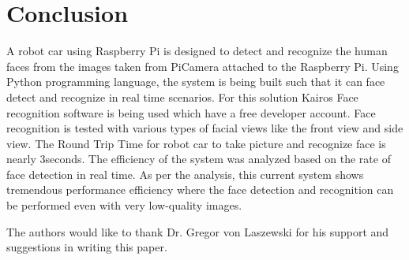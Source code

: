 \documentclass[sigconf]{acmart}
\begin{document}
\section{Conclusion}
A robot car using Raspberry Pi is designed to detect and recognize the human faces from the images taken from PiCamera attached to the Raspberry Pi. Using Python programming language, the system is being built such that it can face detect and recognize in real time scenarios. For this solution Kairos Face recognition software is being used which have a free developer account. Face recognition is tested with various types of facial views like the front view and side view. The Round Trip Time for robot car to take picture and recognize face is nearly 3seconds. The efficiency of the system was analyzed based on the rate of face detection in real time. As per the analysis, this current system shows tremendous performance efficiency where the face detection and recognition can be performed even with very low-quality images.


\begin{acks}

The authors would like to thank Dr. Gregor von Laszewski for his support and suggestions in writing this paper.

\end{acks}


 
\end{document}
